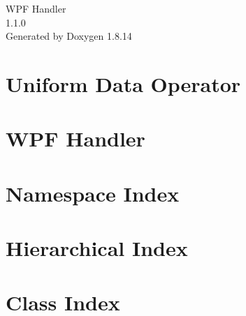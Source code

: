 \documentclass[twoside]{book}
\newcommand{\+}{\discretionary{\mbox{\scriptsize$\hookleftarrow$}}{}{}}
\newcommand{\clearemptydoublepage}{%
  \newpage{\pagestyle{empty}\cleardoublepage}%
}
\begin{document}
\hypersetup{pageanchor=false,
             bookmarksnumbered=true,
             pdfencoding=unicode
            }
\begin{titlepage}
\vspace*{7cm}
\begin{center}%
{\Large W\+PF Handler \\[1ex]\large 1.\+1.\+0 }\\
\vspace*{1cm}
{\large Generated by Doxygen 1.8.14}\\
\end{center}
\end{titlepage}
\clearemptydoublepage
{}
\tableofcontents
\clearemptydoublepage
{}
\hypersetup{pageanchor=true}

\chapter{Uniform Data Operator}
\label{md__d_1__work__git_hub_wpf-handler__frameworks_uniform-data-operator__r_e_a_d_m_e}

\chapter{W\+PF Handler}
\label{md__d_1__work__git_hub_wpf-handler__r_e_a_d_m_e}

\chapter{Namespace Index}

\chapter{Hierarchical Index}

\chapter{Class Index}

\end{document}
